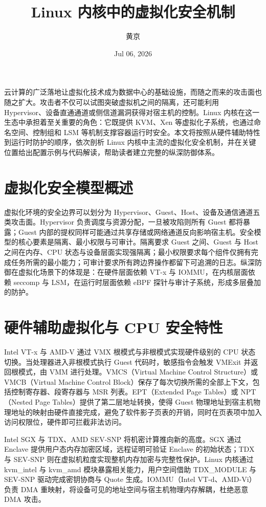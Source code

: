 \title{Linux 内核中的虚拟化安全机制}
\author{黄京}
\date{Jul 06, 2026}
\maketitle
云计算的广泛落地让虚拟化技术成为数据中心的基础设施，而随之而来的攻击面也随之扩大。攻击者不仅可以试图突破虚拟机之间的隔离，还可能利用 Hypervisor、设备直通通道或侧信道漏洞获得对宿主机的控制。Linux 内核在这一生态中承担着至关重要的角色：它既提供 KVM、Xen 等虚拟化子系统，也通过命名空间、控制组和 LSM 等机制支撑容器运行时安全。本文将按照从硬件辅助特性到运行时防护的顺序，依次剖析 Linux 内核中主流的虚拟化安全机制，并在关键位置给出配置示例与代码解读，帮助读者建立完整的纵深防御体系。\par
\chapter{虚拟化安全模型概述}
虚拟化环境的安全边界可以划分为 Hypervisor、Guest、Host、设备及通信通道五类攻击面。Hypervisor 负责调度与资源分配，一旦被攻陷则所有 Guest 都将暴露；Guest 内部的提权同样可能通过共享存储或网络通道反向影响宿主机。安全模型的核心要素是隔离、最小权限与可审计。隔离要求 Guest 之间、Guest 与 Host 之间在内存、CPU 状态与设备层面实现强隔离；最小权限要求每个组件仅拥有完成任务所需的最小能力；可审计要求所有跨边界操作都留下可追溯的日志。纵深防御在虚拟化场景下的体现是：在硬件层面依赖 VT-x 与 IOMMU，在内核层面依赖 seccomp 与 LSM，在运行时层面依赖 eBPF 探针与审计子系统，形成多层叠加的防护。\par
\chapter{硬件辅助虚拟化与 CPU 安全特性}
Intel VT-x 与 AMD-V 通过 VMX 根模式与非根模式实现硬件级别的 CPU 状态切换。当处理器进入非根模式执行 Guest 代码时，敏感指令会触发 VMExit 并返回根模式，由 VMM 进行处理。VMCS（Virtual Machine Control Structure）或 VMCB（Virtual Machine Control Block）保存了每次切换所需的全部上下文，包括控制寄存器、段寄存器与 MSR 列表。EPT（Extended Page Tables）或 NPT（Nested Page Tables）提供了第二层地址转换，使得 Guest 物理地址到宿主机物理地址的映射由硬件直接完成，避免了软件影子页表的开销，同时在页表项中加入访问权限位，硬件即可拦截非法访问。\par
Intel SGX 与 TDX、AMD SEV-SNP 将机密计算推向新的高度。SGX 通过 Enclave 提供用户态内存加密区域，远程证明可验证 Enclave 的初始状态；TDX 与 SEV-SNP 则在虚拟机粒度实现整机内存加密与完整性保护。Linux 内核通过 kvm\_{}intel 与 kvm\_{}amd 模块暴露相关能力，用户空间借助 TDX\_{}MODULE 与 SEV-SNP 驱动完成密钥协商与 Quote 生成。IOMMU（Intel VT-d、AMD-Vi）负责 DMA 重映射，将设备可见的地址空间与宿主机物理内存解耦，杜绝恶意 DMA 攻击。\par
